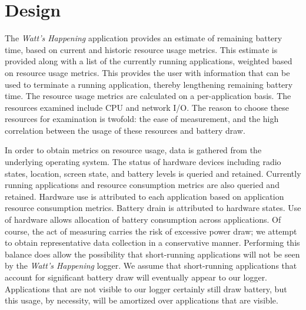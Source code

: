 \section*{Design}
% 

The \emph{Watt's Happening} application provides an estimate of remaining battery time, based on current and historic resource usage metrics. 
This estimate is provided along with a list of the currently running applications, weighted based on resource usage metrics.  
This provides the user with information that can be used to terminate a running application, thereby lengthening remaining battery time.
The resource usage metrics are calculated on a per-application basis.
The resources examined include CPU and network I/O.
The reason to choose these resources for examination is twofold: the ease of measurement, and the high correlation between the usage of these resources and battery draw.

In order to obtain metrics on resource usage, data is gathered from the underlying operating system.
The status of hardware devices including radio states, location, screen state, and battery levels is queried and retained.
Currently running applications and resource consumption metrics are also queried and retained. 
Hardware use is attributed to each application based on application resource consumption metrics. 
Battery drain is attributed to hardware states.
Use of hardware allows allocation of battery consumption across applications.
Of course, the act of measuring carries the risk of excessive power draw; we attempt to obtain representative data collection in a conservative manner.
Performing this balance does allow the possibility that short-running applications will not be seen by the \emph{Watt's Happening} logger.
We assume that short-running applications that account for significant battery draw will eventually appear to our logger.
Applications that are not visible to our logger certainly still draw battery, but this usage, by necessity, will be amortized over applications that are visible.

